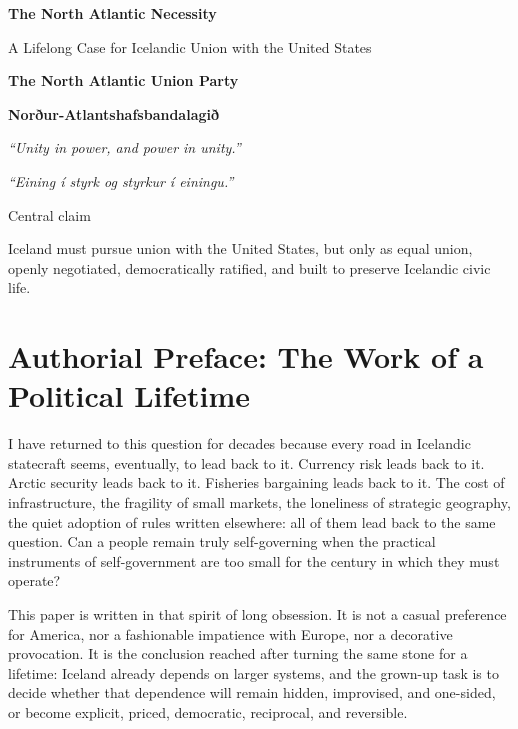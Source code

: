\documentclass[11pt,a4paper]{article}
\newcommand{\PartyEN}{The North Atlantic Union Party}
\newcommand{\PartyIS}{Norður-Atlantshafsbandalagið}
\newcommand{\MottoEN}{Unity in power, and power in unity}
\newcommand{\MottoIS}{Eining í styrk og styrkur í einingu}
\begin{document}
\hypersetup{pageanchor=false}
\begin{titlepage}
  \centering
  \vspace*{1.8cm}
  {\Huge\bfseries The North Atlantic Necessity\par}
  \vspace{0.4cm}
  {\LARGE A Lifelong Case for Icelandic Union with the United States\par}
  \vspace{1.1cm}
  {\Large\bfseries \PartyEN\par}
  \vspace{0.2cm}
  {\large\bfseries \PartyIS\par}
  \vspace{1.2cm}
  {\Large\itshape ``\MottoEN.''\par}
  \vspace{0.2cm}
  {\Large\itshape ``\MottoIS.''\par}
  \vfill
  {\large Central claim\par}
  \vspace{0.1cm}
  {\large Iceland must pursue union with the United States, but only as equal union, openly negotiated, democratically ratified, and built to preserve Icelandic civic life.\par}
\end{titlepage}
\hypersetup{pageanchor=true}

\tableofcontents
\newpage
{}

\section*{Authorial Preface: The Work of a Political Lifetime}
I have returned to this question for decades because every road in Icelandic statecraft seems, eventually, to lead back to it. Currency risk leads back to it. Arctic security leads back to it. Fisheries bargaining leads back to it. The cost of infrastructure, the fragility of small markets, the loneliness of strategic geography, the quiet adoption of rules written elsewhere: all of them lead back to the same question. Can a people remain truly self-governing when the practical instruments of self-government are too small for the century in which they must operate?

This paper is written in that spirit of long obsession. It is not a casual preference for America, nor a fashionable impatience with Europe, nor a decorative provocation. It is the conclusion reached after turning the same stone for a lifetime: Iceland already depends on larger systems, and the grown-up task is to decide whether that dependence will remain hidden, improvised, and one-sided, or become explicit, priced, democratic, reciprocal, and reversible.
\end{document}
